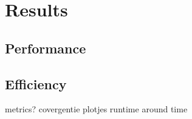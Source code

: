 \chapter{Results}\label{ch:results}

\section{Performance}



\section{Efficiency}



metrics?
covergentie plotjes
runtime
around time